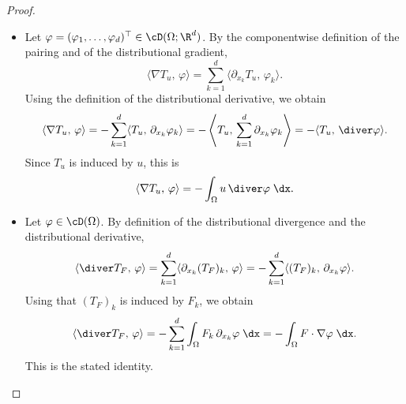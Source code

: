\begin{proof}
	\begin{itemize}
		\item[i)] Let $\varphi=(\varphi_1,\ldots,\varphi_d)^\top\in\cD(\Omega;\R^d)$. By the componentwise definition of the pairing and of the distributional gradient,
		      \begin{equation*}
			      \langle \nabla T_u,\,\varphi\rangle
			      =
			      \sum_{k=1}^d \langle \partial_{x_k}T_u,\,\varphi_k\rangle.
		      \end{equation*}
		      Using the definition of the distributional derivative, we obtain
		      \begin{equation*}
			      \langle \nabla T_u,\,\varphi\rangle
			      =
			      -\sum_{k=1}^d \langle T_u,\,\partial_{x_k}\varphi_k\rangle
			      =
			      -\left\langle T_u,\,\sum_{k=1}^d\partial_{x_k}\varphi_k\right\rangle
			      =
			      -\langle T_u,\,\diver\varphi\rangle.
		      \end{equation*}
		      Since $T_u$ is induced by $u$, this is
		      \begin{equation*}
			      \langle \nabla T_u,\,\varphi\rangle
			      =
			      -\int_\Omega u\,\diver\varphi\;\dx.
		      \end{equation*}

		\item[ii)] Let $\varphi\in\cD(\Omega)$. By definition of the distributional divergence and the distributional derivative,
		      \begin{equation*}
			      \langle \diver T_F,\,\varphi\rangle
			      =
			      \sum_{k=1}^d \langle \partial_{x_k}(T_F)_k,\,\varphi\rangle
			      =
			      -\sum_{k=1}^d \langle (T_F)_k,\,\partial_{x_k}\varphi\rangle.
		      \end{equation*}
		      Using that $(T_F)_k$ is induced by $F_k$, we obtain
		      \begin{equation*}
			      \langle \diver T_F,\,\varphi\rangle
			      =
			      -\sum_{k=1}^d \int_\Omega F_k\,\partial_{x_k}\varphi\;\dx
			      =
			      -\int_\Omega F\cdot\nabla\varphi\;\dx.
		      \end{equation*}
		      This is the stated identity.


\end{itemize}
\end{proof}
